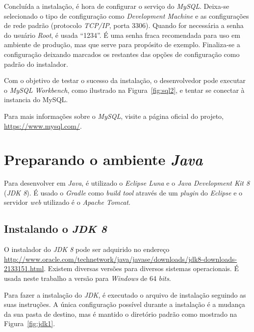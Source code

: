 Concluída a instalação, é hora de configurar o serviço do \textit{MySQL}. Deixa-se selecionado o tipo de configuração como \textit{Development Machine} e as configurações de rede padrão (protocolo \textit{TCP/IP}, porta 3306). Quando for necessária a senha do usuário \textit{Root}, é usada “1234”. É uma senha fraca recomendada para uso em ambiente de produção, mas que serve para propósito de exemplo. Finaliza-se a configuração deixando marcados os restantes das opções de configuração como padrão do instalador.

Com o objetivo de testar o sucesso da instalação, o desenvolvedor pode executar o \textit{MySQL Workbench}, como ilustrado na Figura~\ref{fig:sql2}, e tentar se conectar à instancia do MySQL.


Para mais informações sobre o \textit{MySQL}, visite a página oficial do projeto, \url{https://www.mysql.com/}.

\section{Preparando o ambiente \textit{Java}}

Para desenvolver em \textit{Java}, é utilizado o \textit{Eclipse Luna} e o \textit{Java Development Kit 8} (\textit{JDK 8}). É usado o \textit{Gradle} como \textit{build tool} através de um \textit{plugin} do \textit{Eclipse} e o servidor \textit{web} utilizado é o \textit{Apache Tomcat}.

\subsection{Instalando o \textit{JDK 8}}

O instalador do \textit{JDK 8} pode ser adquirido no endereço \url{http://www.oracle.com/technetwork/java/javase/downloads/jdk8-downloads-2133151.html}. Existem diversas versões para diversos sistemas operacionais. É usada neste trabalho a versão para \textit{Windows} de 64 \textit{bits}. 

Para fazer a instalação do \textit{JDK}, é executado o arquivo de instalação seguindo as suas instruções. A única configuração possível durante a instalação é a mudança da sua pasta de destino, mas é mantido o diretório padrão como mostrado na Figura~\ref{fig:jdk1}.



